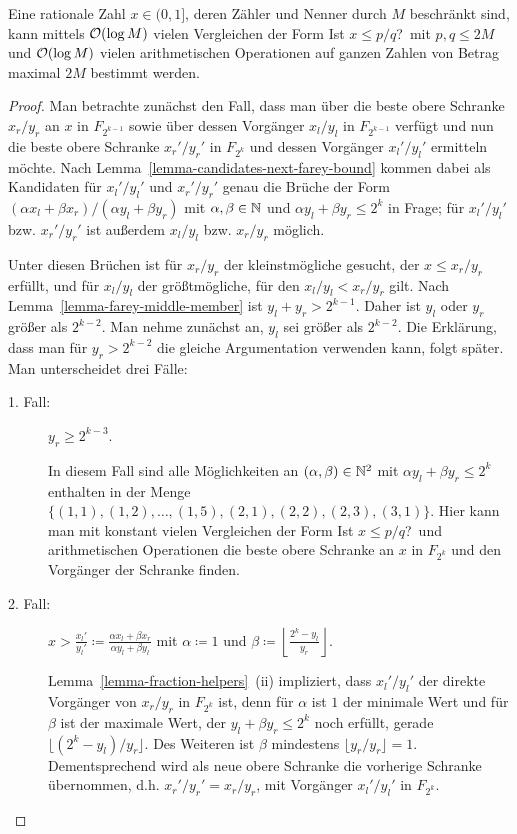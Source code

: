 \begin{theorem}\label{theorem-find-fraction}
	Eine rationale Zahl $x\in(0,1]$, deren Zähler und Nenner durch $M$ beschränkt sind, kann mittels $\mathcal{O}(\log M)$ vielen Vergleichen der Form \glqq Ist $x\leq p/q$?\grqq\ mit $p,q\leq 2M$ und $\mathcal{O}(\log M)$ vielen arithmetischen Operationen auf ganzen Zahlen von Betrag maximal $2M$ bestimmt werden.
\end{theorem}
\begin{proof}	
	Man betrachte zunächst den Fall, dass man über die beste obere Schranke $x_r/y_r$ an $x$ in $F_{2^{k-1}}$ sowie über dessen Vorgänger $x_l/y_l$ in $F_{2^{k-1}}$ verfügt und nun die beste obere Schranke $x_r'/y_r'$ in $F_{2^{k}}$ und dessen Vorgänger $x_l'/y_l'$ ermitteln möchte.
	Nach Lemma~\ref{lemma-candidates-next-farey-bound} kommen dabei als Kandidaten für $x_l'/y_l'$ und $x_r'/y_r'$ genau die Brüche der Form $(\alpha x_l + \beta x_r)/(\alpha y_l + \beta y_r)$ mit $\alpha,\beta\in\mathbb{N}$ und $\alpha y_l + \beta y_r \leq 2^{k}$ in Frage; für $x_l'/y_l'$ bzw. $x_r'/y_r'$ ist außerdem $x_l/y_l$ bzw. $x_r/y_r$ möglich.
	
	Unter diesen Brüchen ist für $x_r/y_r$ der kleinstmögliche gesucht, der $x\leq x_r/y_r$ erfüllt, und für $x_l/y_l$ der größtmögliche, für den $x_l/y_l < x_r/y_r$ gilt.
	Nach Lemma~\ref{lemma-farey-middle-member} ist $y_l + y_r > 2^{k-1}$.
	Daher ist $y_l$ oder $y_r$ größer als $2^{k-2}$.
	Man nehme zunächst an, $y_l$ sei größer als $2^{k-2}$. 
	Die Erklärung, dass man für $y_r > 2^{k-2}$ die gleiche Argumentation verwenden kann, folgt später.
	Man unterscheidet drei Fälle:
	
	\begin{description}
		\item[1. Fall:] $y_r \geq 2^{k-3}$.
		
		In diesem Fall sind alle Möglichkeiten an $(\alpha,\beta)\in\mathbb{N}^2$ mit $\alpha y_l + \beta y_r \leq 2^{k}$ enthalten in der Menge $\{ (1,1), (1,2),\dots,(1,5), (2,1), (2,2),(2,3),(3,1) \}$.
		Hier kann man mit konstant vielen Vergleichen der Form \glqq Ist $x\leq p/q$?\grqq\ und arithmetischen Operationen die beste obere Schranke an $x$ in $F_{2^{k}}$ und den Vorgänger der Schranke finden.
		
		\item[2. Fall:] $x > \frac{x_l'}{y_l'} \coloneq \frac{\alpha x_l + \beta x_r}{\alpha y_l + \beta y_l}$ mit $\alpha \coloneq 1$ und $\beta \coloneq \left\lfloor \frac{2^{k} - y_l}{y_r}\right\rfloor$.
		
		Lemma~\ref{lemma-fraction-helpers}~(ii) impliziert, dass $x_l'/y_l'$ der direkte Vorgänger von $x_r/y_r$ in $F_{2^{k}}$ ist, denn für $\alpha$ ist $1$ der minimale Wert und für $\beta$ ist der maximale Wert, der $y_l + \beta y_r \leq 2^{k}$ noch erfüllt, gerade $\lfloor (2^{k} - y_l)/y_r \rfloor$.
		Des Weiteren ist $\beta$ mindestens $\lfloor y_r/y_r \rfloor = 1$.
		Dementsprechend wird als neue obere Schranke die vorherige Schranke übernommen, d.h. $x_r'/y_r' = x_r/y_r$, mit Vorgänger $x_l'/y_l'$ in $F_{2^{k}}$.
		

\end{description}
\end{proof}

